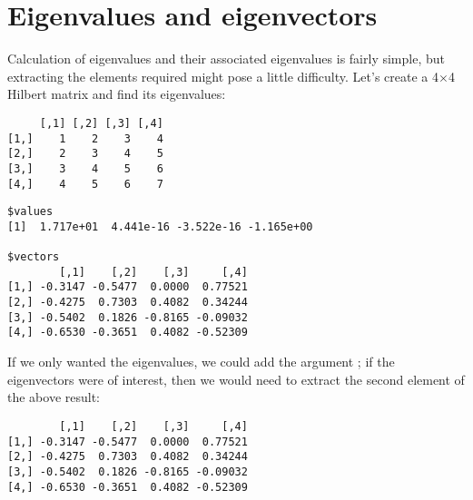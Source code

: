 \section{Eigenvalues and eigenvectors} 
 
Calculation of eigenvalues and their associated eigenvalues is fairly simple, but extracting the elements required might pose a little difficulty. 
 Let's create a 4$\times$4 Hilbert matrix and find its eigenvalues: 
\begin{knitrout}
\color{fgcolor}\begin{kframe}
\begin{alltt}
\hlstd{> }\hlkwb{=}\hlstd{(}\hlopt{-}\hlstd{,}\hlstd{=}\hlstd{,} \hlstd{=}\hlstd{)}
\hlstd{> }\hlkwb{=}\hlopt{+}\hlopt{+}
\hlstd{> }
\end{alltt}
\begin{verbatim}
     [,1] [,2] [,3] [,4]
[1,]    1    2    3    4
[2,]    2    3    4    5
[3,]    3    4    5    6
[4,]    4    5    6    7
\end{verbatim}
\begin{alltt}
\hlstd{> }
\end{alltt}
\begin{verbatim}
$values
[1]  1.717e+01  4.441e-16 -3.522e-16 -1.165e+00

$vectors
        [,1]    [,2]    [,3]     [,4]
[1,] -0.3147 -0.5477  0.0000  0.77521
[2,] -0.4275  0.7303  0.4082  0.34244
[3,] -0.5402  0.1826 -0.8165 -0.09032
[4,] -0.6530 -0.3651  0.4082 -0.52309
\end{verbatim}
\end{kframe}
\end{knitrout}
If we only wanted the eigenvalues, we could add the argument ; if the eigenvectors were of interest, then we would need to extract the second element of the above result: 
\begin{knitrout}
\color{fgcolor}\begin{kframe}
\begin{alltt}
\hlstd{> }\hlopt{$}
\end{alltt}
\begin{verbatim}
        [,1]    [,2]    [,3]     [,4]
[1,] -0.3147 -0.5477  0.0000  0.77521
[2,] -0.4275  0.7303  0.4082  0.34244
[3,] -0.5402  0.1826 -0.8165 -0.09032
[4,] -0.6530 -0.3651  0.4082 -0.52309
\end{verbatim}
\end{kframe}
\end{knitrout}


